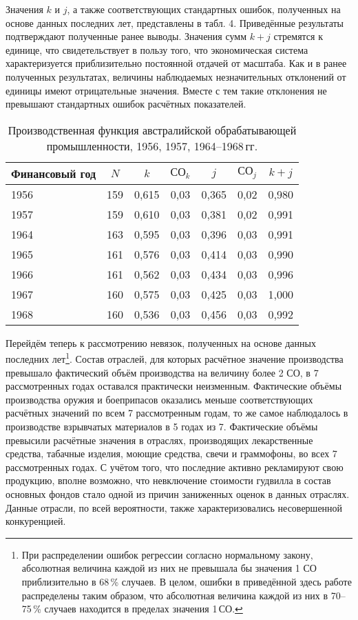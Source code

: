 \documentclass{article}
\begin{document}
Значения \(k\) и \(j\), а также соответствующих стандартных ошибок, полученных на основе данных последних лет, представлены в табл. 4. Приведённые результаты подтверждают полученные ранее выводы. Значения сумм \(k + j\) стремятся к единице, что свидетельствует в пользу того, что экономическая система характеризуется приблизительно постоянной отдачей от масштаба. Как и в ранее полученных результатах, величины наблюдаемых незначительных отклонений от единицы имеют отрицательные значения. Вместе с тем такие отклонения не превышают стандартных ошибок расчётных показателей.

\begin{table}[!t]
\centering
\footnotesize{
\caption{Производственная функция австралийской обрабатывающей промышленности, 1956, 1957, 1964--1968\,гг.}%
\label{tab4}%
\begin{tabular}{lcccccc}
 \toprule
 \toprule
Финансовый год & \(N\) & \(k\) & \(\text{СО}_k\) & \(j\) & \(\text{СО}_j\) & \(k + j\)\\
\midrule
1956 & 159 & 0,615 & 0,03 & 0,365 & 0,02 & 0,980\\
1957 & 159 & 0,610 & 0,03 & 0,381 & 0,02 & 0,991\\
1964 & 163 & 0,595 & 0,03 & 0,396 & 0,03 & 0,991\\
1965 & 161 & 0,576 & 0,03 & 0,414 & 0,03 & 0,990\\
1966 & 161 & 0,562 & 0,03 & 0,434 & 0,03 & 0,996\\
1967 & 160 & 0,575 & 0,03 & 0,425 & 0,03 & 1,000\\
1968 & 160 & 0,536 & 0,03 & 0,456 & 0,03 & 0,992\\
\bottomrule
\end{tabular}
}
\end{table}

Перейдём теперь к рассмотрению невязок, полученных на основе данных последних лет\footnote{При распределении ошибок регрессии согласно нормальному закону, абсолютная величина каждой из них не превышала бы значения 1 СО приблизительно в 68\,\% случаев. В целом, ошибки в приведённой здесь работе распределены таким образом, что абсолютная величина каждой из них в 70--75\,\% случаев находится в пределах значения 1\,СО.}. Состав отраслей, для которых расчётное значение производства превышало фактический объём производства на величину более 2 СО, в 7 рассмотренных годах оставался практически неизменным. Фактические объёмы производства оружия и боеприпасов оказались меньше соответствующих расчётных значений по всем 7 рассмотренным годам, то же самое наблюдалось в производстве взрывчатых материалов в 5 годах из 7. Фактические объёмы превысили расчётные значения в отраслях, производящих лекарственные средства, табачные изделия, моющие средства, свечи и граммофоны, во всех 7 рассмотренных годах. С учётом того, что последние активно рекламируют свою продукцию, вполне возможно, что невключение стоимости гудвилла в состав основных фондов стало одной из причин заниженных оценок в данных отраслях. Данные отрасли, по всей вероятности, также характеризовались несовершенной конкуренцией.
\end{document}
